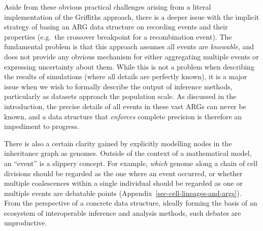 \documentclass{article}
\begin{document}
Aside from these obvious practical challenges arising from a
literal implementation of the Griffiths approach, there is a deeper
issue with the implicit strategy of basing an ARG data structure on
recording events and their properties (e.g.\ the crossover breakpoint
for a recombination event). The fundamental problem
is that this approach assumes all events are \emph{knowable}, and does not
provide any obvious mechanism for either aggregating multiple events
or expressing uncertainty about them. While this is not a
problem when describing the results of simulations (where all details
are perfectly known), it is a major issue when we wish to
formally describe the output of inference methods, particularly
as datasets approach the population scale.
As discussed in the introduction,
the precise details of all events in these vast ARGs can never be
known, and a data structure that \emph{enforces} complete
precision is therefore an impediment to progress.

There is also a certain clarity gained by explicitly modelling nodes
in the inheritance graph as genomes.
Outside of the context of a
mathematical model, an ``event'' is a slippery concept.
For example, \emph{which} genome along a chain of cell divisions should be
regarded as the one where an event occurred,
or whether multiple coalescences
within a single individual should be regarded as one or multiple events are
debatable points (Appendix~\ref{sec-cell-lineages-and-args}).
From the perspective of a concrete data structure,
ideally forming the basis of an ecosystem of interoperable
inference and analysis methods, such debates
are unproductive.
\end{document}
